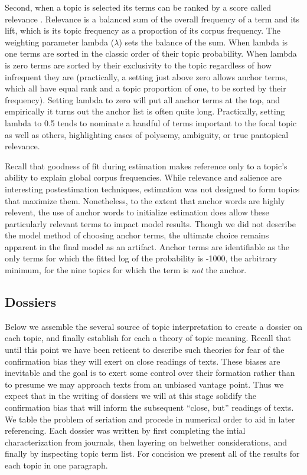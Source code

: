 \documentclass[]{book}
\theoremstyle{definition}
\theoremstyle{definition}
\theoremstyle{definition}
\theoremstyle{remark}
\begin{document}
Second, when a topic is selected its terms can be ranked by a score
called relevance \citep[66]{Sievert2014LDAvis}. Relevance is a balanced
sum of the overall frequency of a term and its lift, which is its topic
frequency as a proportion of its corpus frequency. The weighting
parameter lambda (\(\lambda\)) sets the balance of the sum. When lambda
is one terms are sorted in the classic order of their topic probability.
When lambda is zero terms are sorted by their exclusivity to the topic
regardless of how infrequent they are (practically, a setting just above
zero allows anchor terms, which all have equal rank and a topic
proportion of one, to be sorted by their frequency). Setting lambda to
zero will put all anchor terms at the top, and empirically it turns out
the anchor list is often quite long. Practically, setting lambda to 0.5
tends to nominate a handful of terms important to the focal topic as
well as others, highlighting cases of polysemy, ambiguity, or true
pantopical relevance.

Recall that goodness of fit during estimation makes reference only to a
topic's ability to explain global corpus frequencies. While relevance
and salience are interesting postestimation techniques, estimation was
not designed to form topics that maximize them. Nonetheless, to the
extent that anchor words are highly relevent, the use of anchor words to
initialize estimation does allow these particularly relevant terms to
impact model results. Though we did not describe the model method of
choosing anchor terms, the ultimate choice remains apparent in the final
model as an artifact. Anchor terms are identifiable as the only terms
for which the fitted log of the probability is -1000, the arbitrary
minimum, for the nine topics for which the term is \emph{not} the
anchor.

\hypertarget{dossiers}{%
\subsection{Dossiers}\label{dossiers}}

Below we assemble the several source of topic interpretation to create a
dossier on each topic, and finally establish for each a theory of topic
meaning. Recall that until this point we have been reticent to describe
such theories for fear of the confirmation bias they will exert on close
readings of texts. These biases are inevitable and the goal is to exert
some control over their formation rather than to presume we may approach
texts from an unbiased vantage point. Thus we expect that in the writing
of dossiers we will at this stage solidify the confirmation bias that
will inform the subsequent ``close, but'' readings of texts. We table
the problem of seriation and procede in numerical order to aid in later
referencing. Each dossier was written by first completing the intial
characterization from journals, then layering on belwether
considerations, and finally by inspecting topic term list. For concision
we present all of the results for each topic in one paragraph.
\end{document}

